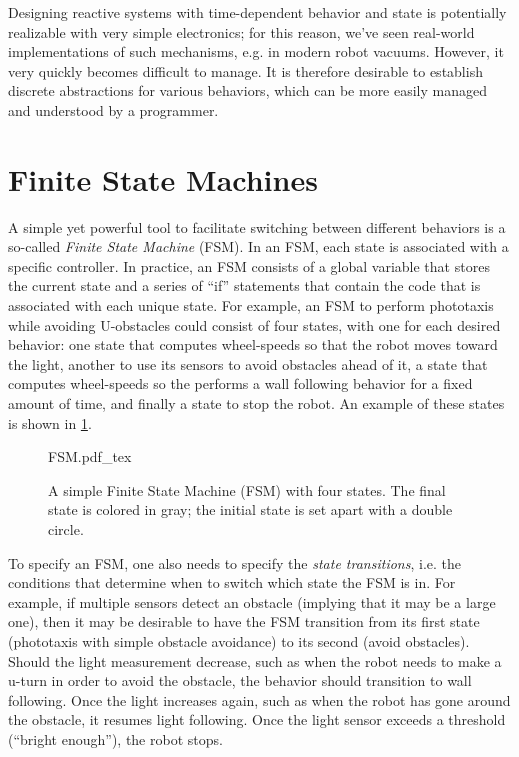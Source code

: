 Designing reactive systems with time-dependent behavior and state is potentially realizable with very simple electronics; for this reason, we've seen real-world implementations of such mechanisms, e.g. in modern robot vacuums.
However, it very quickly becomes difficult to manage. It is therefore desirable to establish discrete abstractions for various behaviors, which can be more easily managed and understood by a programmer.

\section{Finite State Machines}\label{sec:fsm}

A simple yet powerful tool to facilitate switching between different behaviors is a so-called \textsl{Finite State Machine} (FSM). In an FSM, each state is associated with a specific controller. In practice, an FSM consists of a global variable that stores the current state and a series of ``if'' statements that contain the code that is associated with each unique state. For example, an FSM to perform phototaxis while avoiding U-obstacles could consist of four states, with one for each desired behavior: one state that computes wheel-speeds so that the robot moves toward the light, another to use its sensors to avoid obstacles ahead of it, a state that computes wheel-speeds so the performs a wall following behavior for a fixed amount of time, and finally a state to stop the robot. An example of these states is shown in \cref{fig:fsm}.

\begin{figure}
\centering
    \small
    \def\svgwidth{0.9\textwidth}
    {FSM.pdf_tex}
\caption{A simple Finite State Machine (FSM) with four states. The final state is colored in gray; the initial state is set apart with a double circle.\label{fig:fsm}}
\end{figure}

To specify an FSM, one also needs to specify the \textsl{state transitions}, i.e. the conditions that determine when to switch which state the FSM is in. For example, if multiple sensors detect an obstacle (implying that it may be a large one), then it may be desirable to have the FSM transition from its first state (phototaxis with simple obstacle avoidance) to its second (avoid obstacles). Should the light measurement decrease, such as when the robot needs to make a u-turn in order to avoid the obstacle, the behavior should transition to wall following. Once the light increases again, such as when the robot has gone around the obstacle, it resumes light following. Once the light sensor exceeds a threshold (``bright enough''), the robot stops.

